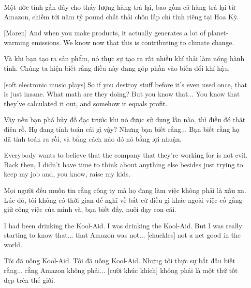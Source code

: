 \documentclass[a4paper]{article}
\begin{document}
	\begin{vietnamese-v2}
		 Một ước tính gần đây cho thấy lượng hàng trả lại, bao gồm cả hàng trả lại từ Amazon, chiếm tới năm tỷ pound chất thải chôn lấp chỉ tính riêng tại Hoa Kỳ.
	\end{vietnamese-v2}
	
	[Maren] And when you make products, it actually generates a lot of planet-warming emissions. We know now that this is contributing to climate change.
	
	\begin{vietnamese-v2}
		[Maren] Và khi bạn tạo ra sản phẩm, nó thực sự tạo ra rất nhiều khí thải làm nóng hành tinh. Chúng ta hiện biết rằng điều này đang góp phần vào biến đổi khí hậu.
	\end{vietnamese-v2}
	
	[soft electronic music plays]
	So if you destroy stuff before it's even used once, that is just insane.
	What math are they doing?
	But you know that... You know that they've calculated it out, and somehow it equals profit.
	
	\begin{vietnamese-v2}
		Vậy nếu bạn phá hủy đồ đạc trước khi nó được sử dụng lần nào, thì điều đó thật điên rồ.
		Họ đang tính toán cái gì vậy?
		Nhưng bạn biết rằng... Bạn biết rằng họ đã tính toán ra rồi, và bằng cách nào đó nó bằng lợi nhuận.
	\end{vietnamese-v2}
	
	Everybody wants to believe that the company that they're working for is not evil.
	Back then, I didn't have time to think about anything else besides just trying to keep my job and, you know, raise my kids.
	
	\begin{vietnamese-v2}
		Mọi người đều muốn tin rằng công ty mà họ đang làm việc không phải là xấu xa.
		Lúc đó, tôi không có thời gian để nghĩ về bất cứ điều gì khác ngoài việc cố gắng giữ công việc của mình và, bạn biết đấy, nuôi dạy con cái.
	\end{vietnamese-v2}
	
	I had been drinking the Kool-Aid. I was drinking the Kool-Aid.
	But I was really starting to know that... that Amazon was not... [chuckles] not a net good in the world.
	
	\begin{vietnamese-v2}
		Tôi đã uống Kool-Aid. Tôi đã uống Kool-Aid.
		Nhưng tôi thực sự bắt đầu biết rằng... rằng Amazon không phải... [cười khúc khích] không phải là một thứ tốt đẹp trên thế giới.
	\end{vietnamese-v2}
	
\end{document}
